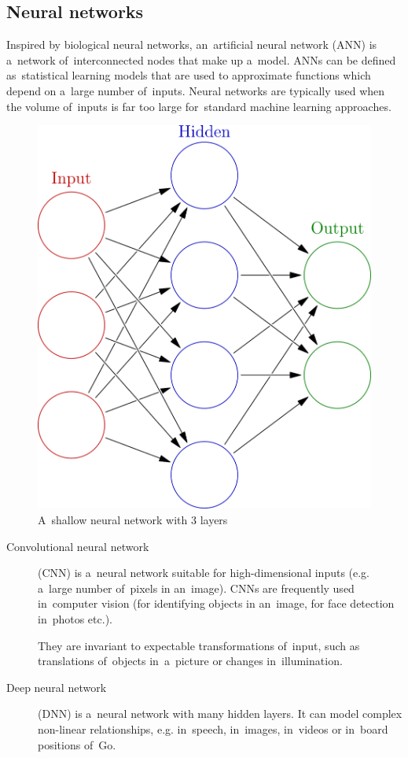 \subsection{Neural networks}

Inspired by biological neural networks, an~artificial neural network (ANN) is a~network of~interconnected nodes that make up a~model.
ANNs can be defined as~statistical learning models that are used to approximate functions which depend on a~large number of~inputs.
Neural networks are typically used when the volume of~inputs is far too large for~standard machine learning approaches.

\begin{figure}[H]
  \centering
  \includegraphics[height=.2\textheight]{../img/colored_neural_network.png}
  \caption{A~shallow neural network with 3 layers}
  \label{fig:shallow-neural-network}
\end{figure}

\begin{description}
  \item [Convolutional neural network] (CNN) is a~neural network suitable for high-dimensional inputs (e.g. a~large number of~pixels in an~image).
    CNNs are frequently used in~computer vision (for identifying objects in an~image, for face detection in~photos etc.).

    They are invariant to expectable transformations of~input, such as translations of~objects in~a~picture or changes in~illumination.
  \item [Deep neural network] (DNN) is a~neural network with many hidden layers.
    It can model complex non-linear relationships, e.g. in~speech, in~images, in~videos or in~board positions of~Go.
\end{description}

